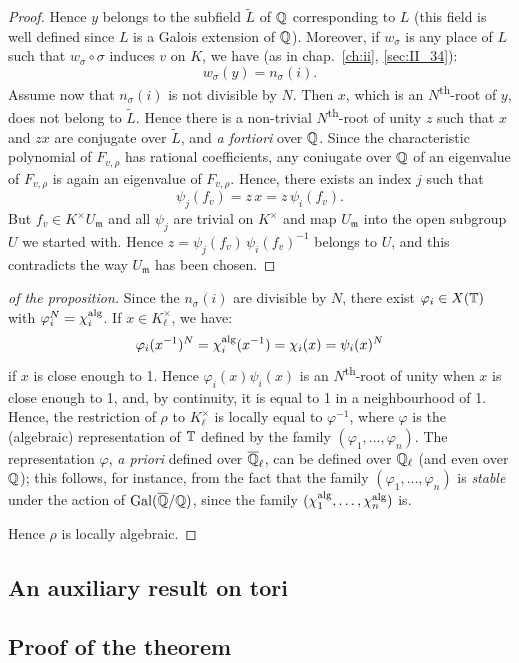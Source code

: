 \begin{proof}
	Hence $y$ belongs to the subfield $\widetilde{L}$ of $\mathbb{Q}$ corresponding
	to $L$ (this field is well defined since $L$ is a Galois extension of
	$\mathbb{Q}$).  Moreover, if $w_\sigma$ is any place of $L$ such that $w_\sigma
	\circ \sigma$ induces $v$ on $K$, we have (as in chap.~\ref{ch:ii},
	\ref{sec:II_34}):
	\[
		w_\sigma(y) = n_\sigma(i).
	\]
	Assume now that $n_\sigma(i)$ is not divisible by $N$. Then $x$, which
	is an $N$\textsuperscript{th}-root of $y$, does not belong to
	$\widetilde{L}$. Hence there is a
	\dpage
	non-trivial $N$\textsuperscript{th}-root of unity $z$ such that $x$ and
	$zx$ are conjugate over $\widetilde{L}$, and \emph{a fortiori} over
	$\mathbb{Q}$. Since the characteristic polynomial of $F_{v, \rho}$ has rational
	coefficients, any coniugate over $\mathbb{Q}$ of an eigenvalue of $F_{v, \rho}$
	is again an eigenvalue of $F_{v, \rho}$. Hence, there exists an index
	$j$ such that
	\[
		\psi_j(f_v) = z\, x = z\, \psi_i(f_v).
	\]
	But $f_v \in K^\times U_{\mathfrak{m}}$ and all $\psi_j$ are trivial on
	$K^\times$ and map $U_{\mathfrak{m}}$ into the open subgroup $U$ we
	started with. Hence $z = \psi_j(f_v) \, \psi_i(f_v)^{-1}$ belongs to
	$U$, and this contradicts the way $U_{\mathfrak{m}}$ has been chosen.
\end{proof}

\begin{proof}[ of the proposition]
	Since the $n_\sigma(i)$ are divisible by $N$, there exist $\varphi_i
	\in X(\mathbb{T})$ with $\varphi_i^N = \chi_i^{\rm alg}$. If $x \in
	K_\ell^\times$, we have:
	\[
		\varphi_i(x^{-1})^N = \chi_i^{\rm alg}(x^{-1}) = \chi_i(x) =
		\psi_i(x)^N
	\]
	if $x$ is close enough to 1. Hence $\varphi_i(x) \psi_i(x)$ is an
	$N$\textsuperscript{th}-root of unity when $x$ is close enough to 1,
	and, by continuity, it is equal to 1 in a neighbourhood of 1. Hence,
	the restriction of $\rho$ to $K_\ell^\times$ is locally equal to
	$\varphi^{-1}$, where $\varphi$ is the (algebraic) representation of
	$\mathbb{T}$ defined by the family $(\varphi_1, \dots, \varphi_n)$. The
	representation $\varphi$, \emph{a priori} defined over $\overline{\mathbb{Q}}_\ell$,
	can be defined over $\mathbb{Q}_\ell$ (and even over $\mathbb{Q}$); this follows, for
	instance, from the fact that the family $(\varphi_1, \dots, \varphi_n)$
	is \emph{stable} under the action of $\operatorname{Gal}(\overline{\mathbb{Q}}/\mathbb{Q})$, since the
	family $(\chi_1^{\rm alg}, \dots, \chi_n^{\rm alg})$ is.

	Hence $\rho$ is locally algebraic.
\end{proof}

\subsection{An auxiliary result on tori}
\label{sec:III_33}

\subsection{Proof of the theorem}
\label{sec:III_34}
